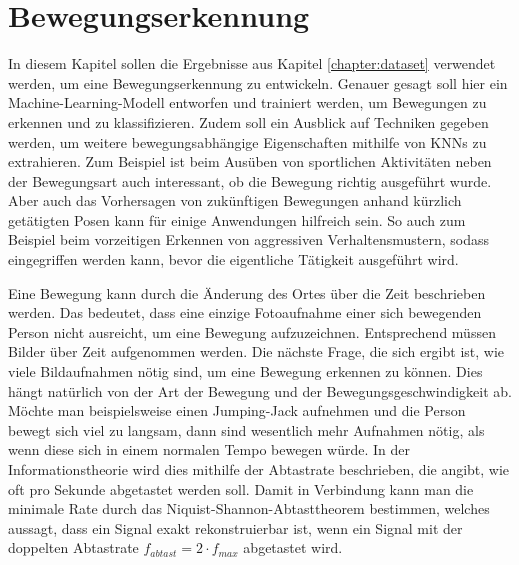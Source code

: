 \chapter{Bewegungserkennung}\label{chapter:motion-detection}
In diesem Kapitel sollen die Ergebnisse aus Kapitel \ref{chapter:dataset}
verwendet werden, um eine Bewegungserkennung zu entwickeln. Genauer gesagt soll
hier ein Machine-Learning-Modell entworfen und trainiert werden, um Bewegungen zu
erkennen und zu klassifizieren. Zudem soll ein Ausblick auf Techniken gegeben
werden, um weitere bewegungsabhängige Eigenschaften mithilfe von KNNs zu
extrahieren. Zum Beispiel ist beim Ausüben von sportlichen Aktivitäten neben der
Bewegungsart auch interessant, ob die Bewegung richtig ausgeführt wurde. Aber
auch das Vorhersagen von zukünftigen Bewegungen anhand kürzlich getätigten Posen
kann für einige Anwendungen hilfreich sein. So auch zum Beispiel beim
vorzeitigen Erkennen von aggressiven Verhaltensmustern, sodass eingegriffen
werden kann, bevor die eigentliche Tätigkeit ausgeführt wird. 

Eine Bewegung kann durch die Änderung des Ortes über die Zeit beschrieben
werden. Das bedeutet, dass eine einzige Fotoaufnahme einer sich bewegenden
Person nicht ausreicht, um eine Bewegung aufzuzeichnen. Entsprechend müssen
Bilder über Zeit aufgenommen werden. Die nächste Frage, die sich ergibt ist, wie
viele Bildaufnahmen nötig sind, um eine Bewegung erkennen zu können. Dies hängt
natürlich von der Art der Bewegung und der Bewegungsgeschwindigkeit ab. Möchte
man beispielsweise einen Jumping-Jack aufnehmen und die Person bewegt sich viel
zu langsam, dann sind wesentlich mehr Aufnahmen nötig, als wenn diese sich in
einem normalen Tempo bewegen würde. In der Informationstheorie wird dies
mithilfe der Abtastrate beschrieben, die angibt, wie oft pro Sekunde abgetastet
werden soll.  Damit in Verbindung kann man die minimale Rate durch das
Niquist-Shannon-Abtasttheorem bestimmen, welches aussagt, dass ein Signal exakt
rekonstruierbar ist, wenn ein Signal mit der doppelten Abtastrate $f_{abtast} =
2 \cdot f_{max}$ abgetastet wird.

